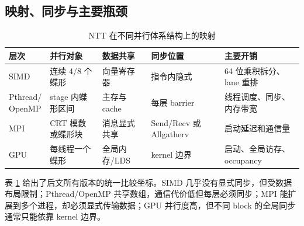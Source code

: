\subsection{映射、同步与主要瓶颈}

\begin{table}[H]
  \centering
  \caption{NTT 在不同并行体系结构上的映射}
  \label{tab:architecture-map}
  \small
  \begin{tabularx}{\textwidth}{p{2.0cm} p{2.8cm} p{2.5cm} p{2.7cm} X}
    \toprule
    层次 & 并行对象 & 数据共享 & 同步位置 & 主要开销 \\
    \midrule
    SIMD & 连续 4/8 个蝶形 & 向量寄存器 & 指令内隐式 & 64 位乘积拆分、lane 重排 \\
    \shortstack{Pthread/\\OpenMP} & stage 内蝶形区间 & 主存与 cache & 每层 barrier & 线程调度、同步、内存带宽 \\
    MPI & CRT 模数或蝶形块 & 消息显式共享 & Send/Recv 或 Allgatherv & 启动延迟和通信量 \\
    GPU & 每线程一个蝶形 & 全局内存/LDS & kernel 边界 & 启动、全局访存、occupancy \\
    \bottomrule
  \end{tabularx}
\end{table}

表 \ref{tab:architecture-map} 给出了后文所有版本的统一比较坐标。SIMD 几乎没有显式同步，但受数据布局限制；Pthread/\allowbreak OpenMP 共享数组，通信代价低但每层必须同步；MPI 能扩展到多个进程，却必须显式传输数据；GPU 并行度高，但不同 block 的全局同步通常只能依靠 kernel 边界。
